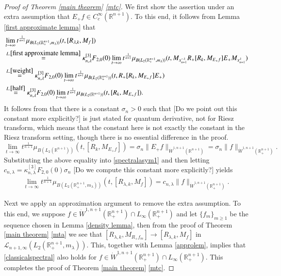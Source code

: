 \documentclass[12pt]{amsart}
\begin{document}
\begin{proof}[Proof of Theorem \ref{main theorem} \eqref{mtc}]
We first show the assertion under an extra assumption that $E_+f\in C_c^\infty(\mathbb{R}^{n+1})$. To this end, it follows from Lemma \ref{first approximate lemma} that
\begin{align}\label{spectralasym1}
&\lim_{t\to\infty}t^{\frac1{n+1}}\mu_{B(L_2(\mathbb{R}^{n+1}_+,m_{\lambda}))}(t,[R_{\lambda,k},M_f])\nonumber\\
&\stackrel{L.\ref{first approximate lemma}}{=}\kappa_{n,\lambda}^{[3]}F_{2,0}(0)\lim_{t\to\infty}t^{\frac1{n+1}}\mu_{B(L_2(\mathbb{R}^{n+1}_+,m_{\lambda}))}(t, M_{x_{n+1}^{-\lambda}} R_+[R_k,M_{E_+f}]E_+ M_{x_{n+1}^{\lambda}})\nonumber\\
&\stackrel{L.\ref{weight}}{=}\kappa_{n,\lambda}^{[3]}F_{2,0}(0)\lim_{t\to\infty}t^{\frac1{n+1}}\mu_{B(L_2(\mathbb{R}^{n+1}_+))}(t, R_+[R_k,M_{E_+f}]E_+ )\nonumber\\
&\stackrel{L.\ref{half}}{=}\kappa_{n,\lambda}^{[3]}F_{2,0}(0)\lim_{t\to\infty}t^{\frac1{n+1}}\mu_{B(L_2(\mathbb{R}^{n+1}))}(t, [R_k,M_{E_+f}] ).
\end{align}
It follows from \cite[Theorem 1.2]{MR4549699} that there is a constant $\sigma_n>0$ such that {\color{blue}[Do we point out this constant more explicitly?]\cite[Theorem 1.2]{MR4549699} is just stated for quantum derivative, not for Riesz transform, which means that the constant here is not exactly the constant in the Riesz transform setting, though there is no essential difference in the proof.} $$\lim_{t\to\infty}t^{\frac1{n+1}}\mu_{B(L_2(\mathbb{R}^{n+1}))}(t, [R_k,M_{E_+f}] )=\sigma_n\|E_+f\|_{\dot{W}^{1,n+1}(\mathbb{R}^{n+1})}=\sigma_n\|f\|_{\dot{W}^{1,n+1}(\mathbb{R}_+^{n+1})}.$$
Substituting the above equality into \eqref{spectralasym1} and then letting $c_{n,\lambda}=\kappa_{n,\lambda}^{[3]}F_{2,0}(0)\sigma_n$ {\color{blue}[Do we compute this constant more explicitly?]} yields
\begin{align}\label{classicalspectral}
\lim_{t\to\infty}t^{\frac1{n+1}}\mu_{B(L_2(\mathbb{R}^{n+1}_+,m_{\lambda}))}(t,[R_{\lambda,k},M_f])=c_{n,\lambda}\|f\|_{\dot{W}^{1,n+1}(\mathbb{R}^{n+1}_+)}.
\end{align}


Next we apply an approximation argument to remove the extra assumption. To this end, we suppose $f\in  \dot{W}^{1,n+1}(\mathbb{R}_+^{n+1})\cap L_{\infty}(\mathbb{R}_+^{n+1})$ and let $\{f_m\}_{m\geq 1}$ be the sequence chosen in Lemma \ref{density lemma}, then from the proof of Theorem \ref{main theorem} \eqref{mta} we see that $[R_{\lambda,k},M_{R_+f_m}]\rightarrow [R_{\lambda,k},M_f]$ in $\mathcal{L}_{n+1,\infty}(L_2(\mathbb{R}^{n+1}_+,m_{\lambda})).$
This, together with Lemma \ref{approlem}, implies that \eqref{classicalspectral} also holds for $f\in  \dot{W}^{1,n+1}(\mathbb{R}_+^{n+1})\cap L_{\infty}(\mathbb{R}_+^{n+1})$. This completes the proof of Theorem \ref{main theorem} \eqref{mtc}.
\end{proof}
\end{document}
